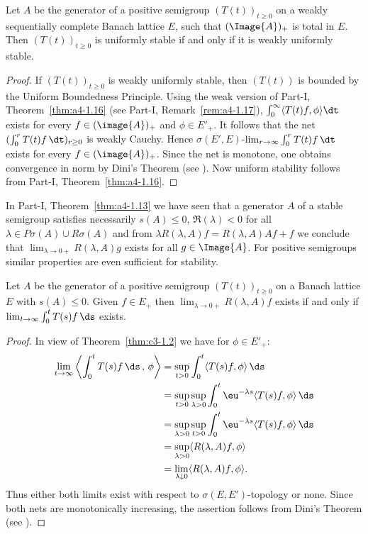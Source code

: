 \begin{proposition}\label{prop:c4-1.7}
%
Let $A$ be the generator of a positive semigroup $(T(t))_{t\geq 0}$ on a weakly sequentially complete Banach lattice $E$, such that $(\Image{A})_{+}$ is total in $E$.
Then $(T(t))_{t\geq 0}$ is uniformly stable if and only if it is weakly uniformly stable.
\end{proposition}
\begin{proof}
If\/ $(T(t))_{t\geq 0}$ is weakly uniformly stable, then $(T(t))$ is bounded by the Uniform Boundedness Principle.
Using the weak version of Part-I, Theorem~\ref{thm:a4-1.16} (see Part-I, Remark~\ref{rem:a4-1.17}), 
$\int_{0}^{\infty} \langle T(t)f,\phi \rangle \dt$ exists for every $f \in (\image{A})_{+}$ and $\phi \in E'_{+}$.
It follows that the net $(\int_{0}^{r} T(t)f \, \dt)_{r\geq 0}$ is weakly Cauchy.
Hence $\sigma(E',E)$-$\lim_{r \to \infty} \int_{0}^{r} T(t)f \, \dt$ exists for every $f \in (\image{A})_{+}$.
Since the net is monotone, one obtains convergence in norm by Dini's Theorem (see \textcite [II. Theorem~5.9]{schaefer:1974}).
Now uniform stability follows from Part-I, Theorem~\ref{thm:a4-1.16}.
\end{proof}
In Part-I, Theorem~\ref{thm:a4-1.13} we have seen that a generator $A$ of a stable semigroup satisfies necessarily $s(A) \leq 0$, $\Re(\lambda) < 0$ for all $\lambda \in P{\sigma}(A) \cup R{\sigma}(A)$ and from $\lambda R(\lambda,A)f = R(\lambda,A)Af + f$ we conclude that $\lim_{\lambda \to 0+} R(\lambda,A)g$ exists for all $g \in \Image{A}$. 
For positive semigroups similar properties are even sufficient for stability.
\begin{lemma}\label{lem:c4-1.8}
%
Let $A$ be the generator of a positive semigroup $(T(t))_{t\geq 0}$ on a Banach lattice $E$ with $s(A) \leq 0$.
Given $f \in E_{+}$ then $\lim_{\lambda \to 0+} R(\lambda,A)f$ exists if and only if\/ $\lim_{t \to \infty} \int_{0}^{t} T(s)f \, \ds$ exists.
\end{lemma}
\begin{proof}
In view of Theorem~\ref{thm:c3-1.2}  we have for $\phi \in E'_{+}$:
\begin{align*}
\lim_{t \to \infty}  \left\langle\int_{0}^{t} T(s)f \, \ds \,,\,\phi\right\rangle &= \sup_{t>0} \int_{0}^{t}\langle T(s)f,\phi\rangle \, \ds \\
&= \sup_{t>0}\sup_{\lambda>0} \int_{0}^{t}\eu^{-\lambda s}\langle T(s)f,\phi\rangle \, \ds \\
&= \sup_{\lambda>0}\sup_{t>0} \int_{0}^{t}\eu^{-\lambda s}\langle T(s)f,\phi\rangle \, \ds \\
&= \sup_{\lambda>0} \langle R(\lambda,A)f,\phi\rangle \\
&= \lim_{\lambda \downarrow 0} \langle R(\lambda,A)f,\phi\rangle.
\end{align*}
Thus either both limits exist with respect to $\sigma(E,E')$-topology or none.
Since both nets are monotonically increasing, the assertion follows from Dini's Theorem (see \textcite[II. Theorem~5.9]{schaefer:1974}).
\end{proof}


